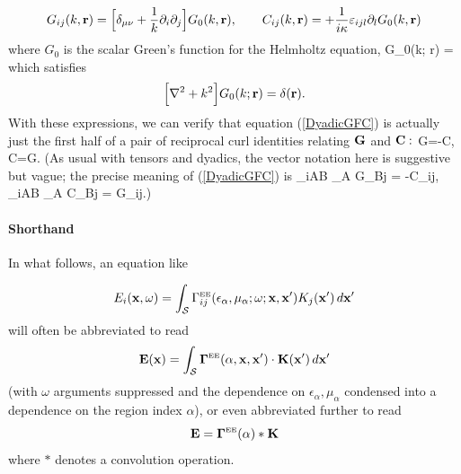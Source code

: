 \documentclass[letterpaper]{article}
\begin{document}
\begin{equation}
G_{ij}(k,\mathbf{r}) =
  \Big[\delta_{\mu\nu} +\frac{1}{k} \partial_i \partial_j \Big]
  G_0(k, \mathbf{r}), \qquad
  C_{ij}(k, \mathbf{r}) = +\frac{1}{i\kappa} \varepsilon_{ijl} 
                          \partial_l G_0(k, \mathbf{r})
\label{GCfromG0}
\end{equation}
where $G_0$ is the scalar Green's function for the Helmholtz equation,
{G_0(k; \vb r)
   =
}
which satisfies
$$ \Big[ \nabla^2 + k^2 \Big] G_0(k; \mathbf{r})
   =\delta(\mathbf{r}).
$$
With these expressions, we can verify that equation (\ref{DyadicGFC}) 
is actually just the first half of a pair of reciprocal curl identities 
relating $\mathbf{G}$ and $\mathbf{C}:$
{
   \nabla \times \vb G=-\vb C, 
\qquad
   \nabla \times \vb C=\vb G.
}
(As usual with tensors and dyadics, the vector notation here
is suggestive but vague; the precise meaning of (\ref{DyadicGFC}) is 
{
    \varepsilon_{iAB} \partial_A G_{Bj} = -C_{ij},
   \qquad
    \varepsilon_{iAB} \partial_A C_{Bj} = G_{ij}.)
}



\paragraph{Shorthand} In what follows, an equation like 

$$ E_i(\mathbf{x}, \omega) = 
   \int_{\mathcal S} 
     \Gamma^{\hbox{\tiny{EE}}}_{ij}(\epsilon_\alpha, \mu_\alpha; \omega; 
                          \mathbf{x}, \mathbf{x}^\prime) 
     K_j(\mathbf{x}^\prime)
    \, d\mathbf{x}^\prime
$$
will often be abbreviated to read 
$$ \mathbf{E}(\mathbf{x}) = 
    \int_{\mathcal S} 
      \boldsymbol{\Gamma}^{\hbox{\tiny{EE}}}(\alpha, \mathbf{x}, \mathbf{x}^\prime) 
         \cdot \mathbf{K}(\mathbf{x}^\prime) 
    \, d\mathbf{x}^\prime
$$
(with $\omega$ arguments suppressed and the dependence 
on $\epsilon_\alpha, \mu_\alpha$ condensed into a dependence
on the region index $\alpha$), or even abbreviated further
to read
$$ \mathbf{E} = \boldsymbol{\Gamma}^{\hbox{\tiny{EE}}}(\alpha) * \mathbf{K} $$
where $*$ denotes a convolution operation.

\newpage
\end{document}
